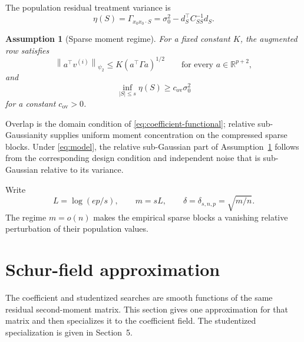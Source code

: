 \documentclass[a4paper,11pt,english]{article}
\newtheorem{assumption}[theorem]{Assumption}
\newcommand{\norm}[1]{\left\lVert #1\right\rVert}
\newcommand{\R}{\mathbb R}
\begin{document}
The population residual treatment variance is
\begin{equation}\label{eq:overlap}
        \eta(S)
        =\Gamma_{x_0x_0\mathbin{\cdot}S}
        =\sigma_0^2-d_S^\top C_{SS}^{-1}d_S.
\end{equation}
\begin{assumption}[Sparse moment regime]\label{ass:sparse-moments}
For a fixed constant $K$, the augmented row satisfies
\begin{equation*}
        \norm{a^\top v^{(i)}}_{\psi_2}
        \le K(a^\top\Gamma a)^{1/2}
        \qquad\text{for every }a\in\R^{p+2},
\end{equation*}
and
\begin{equation*}
        \inf_{|S|\le s}\eta(S)\ge c_{\mathrm{ov}}\sigma_0^2
\end{equation*}
for a constant $c_{\mathrm{ov}}>0$.
\end{assumption}

Overlap is the domain condition of
\eqref{eq:coefficient-functional}; relative sub-Gaussianity supplies
uniform moment concentration on the compressed sparse blocks.
Under \eqref{eq:model}, the relative sub-Gaussian part of
Assumption~\ref{ass:sparse-moments} follows from the corresponding design
condition and independent noise that is sub-Gaussian relative to its
variance.

Write
\begin{equation}\label{eq:search-scale}
        L=\log(ep/s),
        \qquad m=sL,
        \qquad \delta=\delta_{s,n,p}=\sqrt{m/n}.
\end{equation}
The regime $m=o(n)$ makes the empirical sparse blocks a vanishing relative
perturbation of their population values.

\section{Schur-field approximation}\label{sec:schur-field}

The coefficient and studentized searches are smooth functions of the same
residual second-moment matrix.  This section gives one approximation for
that matrix and then specializes it to the coefficient field.  The
studentized specialization is given in Section~5.
\end{document}
